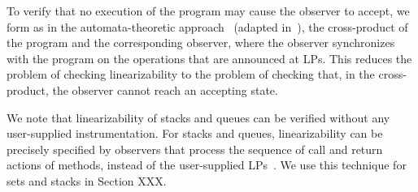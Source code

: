 To verify that no execution of the program may cause the observer to
accept, we form as in the automata-theoretic approach~\cite{VW:modelchecking}
(adapted in~\cite{AHHR:integrated}),
the cross-product of the program  and the corresponding
observer, where the observer synchronizes with the program on the operations
that are announced at LPs. This reduces the
problem of checking linearizability to the problem of checking
that, in the cross-product, the observer cannot reach an accepting state.

We note that linearizability of stacks and queues can be verified without any
user-supplied instrumentation. For stacks and queues,
linearizability can be precisely specified by
observers that process the sequence of call and return actions of
methods,  instead of the user-supplied LPs~\cite{BEEH:icalp15,HSV:concur13}.
We use this technique for sets and stacks in Section XXX.



